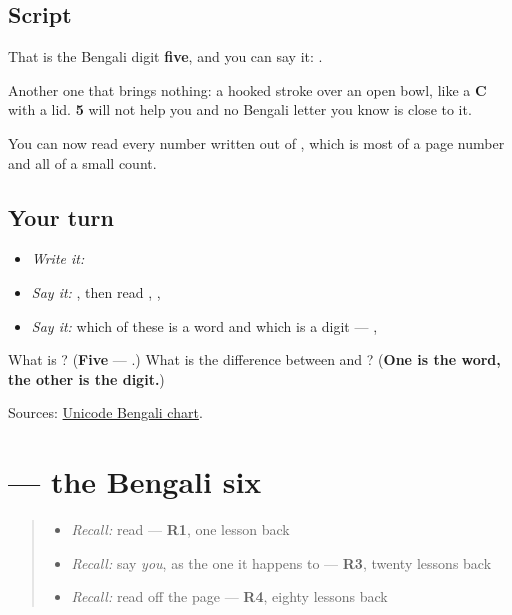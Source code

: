 \subsection*{Script}
\begin{quote}
\end{quote}

That is the Bengali digit \textbf{five}, and you can say it: \textbf{}.

Another one that brings nothing: a hooked stroke over an open bowl, like a \textbf{C} with a lid. \textbf{5} will not help you and no Bengali letter you know is close to it.

You can now read every number written out of \textbf{    }, which is most of a page number and all of a small count.

\subsection*{Your turn}
\begin{itemize}
\raggedright
  \item \emph{Write it:} 
  \item \emph{Say it:} \textbf{}, then read \textbf{}, \textbf{}, \textbf{}
  \item \emph{Say it:} which of these is a word and which is a digit — \textbf{}, \textbf{}
\end{itemize}

\begin{tcolorbox}[breakable,colback=teal!4,colframe=teal!35!black,title={Before you move on}]
What is \textbf{}? (\textbf{Five} — \textbf{}.) What is the difference between \textbf{} and \textbf{}? (\textbf{One is the word, the other is the digit.})

Sources: \href{https://www.unicode.org/charts/PDF/U0980.pdf}{Unicode Bengali chart}.
\end{tcolorbox}
\section[\texorpdfstring{\bn{৬} (digit six)}{৬ (digit six)}]{ — the Bengali six}

\label{lesson:BN-W07-digit-six}



\begin{quote}
\begin{itemize}
\raggedright
  \item \emph{Recall:} read \textbf{} — \textbf{R1}, one lesson back
  \item \emph{Recall:} say \emph{you}, as the one it happens to — \textbf{R3}, twenty lessons back
  \item \emph{Recall:} read \textbf{} off the page — \textbf{R4}, eighty lessons back
\end{itemize}
\end{quote}

